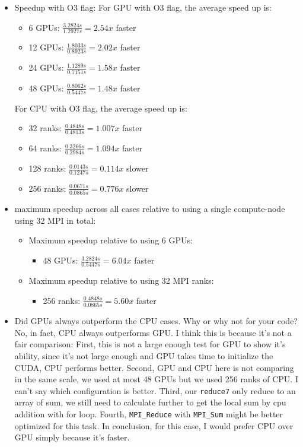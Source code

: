\documentclass{article}
\begin{document}
\begin{itemize}

  \item Speedup with O3 flag:
  For GPU with O3 flag, the average speed up is:

    \begin{itemize}
    \item 6 GPUs: $\frac{3.2824s}{1.2927s}=2.54x$ faster
    \item 12 GPUs: $\frac{1.8033s}{0.8923s}=2.02x$ faster
    \item 24 GPUs: $\frac{1.1289s}{0.7151s}=1.58x$ faster
    \item 48 GPUs: $\frac{0.8062s}{0.5447s}=1.48x$ faster
    \end{itemize}

    For CPU with O3 flag, the average speed up is:

    \begin{itemize}
    \item 32 ranks: $\frac{0.4848s}{0.4813s}=1.007x$ faster
    \item 64 ranks: $\frac{0.3266s}{0.2984s}=1.094x$ faster
    \item 128 ranks: $\frac{0.0143s}{0.1247s}=0.114x$ slower
    \item 256 ranks: $\frac{0.0671s}{0.0865s}=0.776x$ slower
    \end{itemize}
  
  \item maximum speedup across all cases relative to using a single compute-node using 32 MPI in total:
  \begin{itemize}
    \item Maximum speedup relative to using 6 GPUs:
    \begin{itemize}
    \item 48 GPUs: $\frac{3.2824s}{0.5447s}=6.04x$ faster
    \end{itemize}
    \item Maximum speedup relative to using 32 MPI ranks:
    \begin{itemize}
    \item 256 ranks: $\frac{0.4848s}{0.0865s}=5.60x$ faster
    \end{itemize}
    \end{itemize}

  \item Did GPUs always outperform the CPU cases. Why or why not for your code?\\
  No, in fact, CPU always outperforms GPU. I think this is because it's not a fair comparison: First, this is not a large enough test for GPU to show it's ability, since it's not large enough and GPU takes time to initialize the CUDA, CPU performs better. Second, GPU and CPU here is not comparing in the same scale, we used at most 48 GPUs but we used 256 ranks of CPU. I can't say which configuration is better. Third, our \texttt{reduce7} only reduce to an array of sum, we still need to calculate further to get the local sum by cpu addition with for loop. Fourth, \texttt{MPI\_Reduce} with \texttt{MPI\_Sum} might be better optimized for this task. In conclusion, for this case, I would prefer CPU over GPU simply because it's faster. 


\end{itemize}
\end{document}
